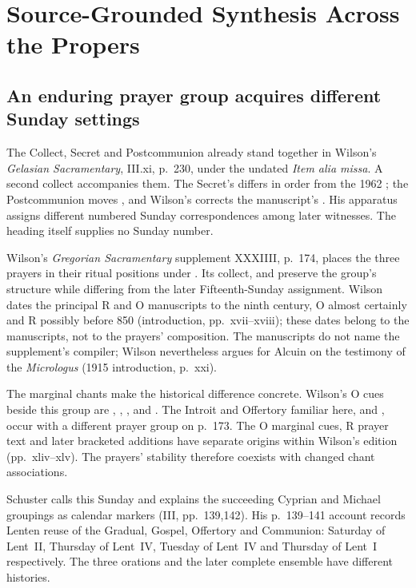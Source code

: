 \sectionguard
\section*{Source-Grounded Synthesis Across the Propers}

\subsection*{An enduring prayer group acquires different Sunday settings}

The Collect, Secret and Postcommunion already stand together in Wilson's
\emph{Gelasian Sacramentary}, III.xi, p.~230, under the undated
\emph{Item alia missa}. A second collect accompanies them. The Secret's
 differs in order from the 1962
; the Postcommunion moves , and
Wilson's  corrects the manuscript's .
His apparatus assigns different numbered Sunday correspondences among
later witnesses. The heading itself supplies no Sunday number.

Wilson's \emph{Gregorian Sacramentary} supplement XXXIIII, p.~174,
places the three prayers in their ritual positions under
. Its collect, 
and  preserve the group's structure while differing
from the later Fifteenth-Sunday assignment. Wilson dates the principal
R and O manuscripts to the ninth century, O almost certainly and R
possibly before 850 (introduction, pp.~xvii--xviii); these dates belong to
the manuscripts, not to the prayers' composition. The manuscripts do not name
the supplement's compiler; Wilson nevertheless argues for Alcuin on the
testimony of the \emph{Micrologus} (1915 introduction, p.~xxi).

The marginal chants make the historical difference concrete. Wilson's O
cues beside this group are , ,
, and . The Introit and
Offertory familiar here,  and
, occur with a different prayer group on
p.~173. The O marginal cues, R prayer text and later bracketed additions
have separate origins within Wilson's edition (pp.~xliv--xlv).
The prayers' stability therefore coexists with changed chant associations.

Schuster calls this Sunday  and
explains the succeeding Cyprian and Michael groupings as calendar markers
(III, pp.~139,142). His p.~139--141 account records Lenten reuse of the
Gradual, Gospel, Offertory and Communion: Saturday of Lent~II, Thursday of
Lent~IV, Tuesday of Lent~IV and Thursday of Lent~I respectively.
The three orations and
the later complete ensemble have different histories.

